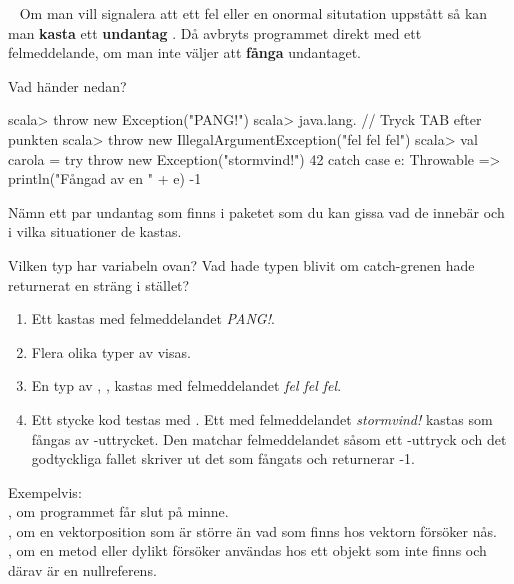 \QUESTBEGIN

\Task  \what~  Om man vill signalera att ett fel eller en onormal situtation uppstått så kan man \textbf{kasta}  ett \textbf{undantag} . Då avbryts programmet direkt med ett felmeddelande, om man inte väljer att \textbf{fånga}  undantaget.

\Subtask Vad händer nedan?
\begin{REPL}
scala> throw new Exception("PANG!")
scala> java.lang.   // Tryck TAB efter punkten
scala> throw new IllegalArgumentException("fel fel fel")
scala> val carola = 
         try 
           throw new Exception("stormvind!")
           42
         catch 
           case e: Throwable => 
             println("Fångad av en " + e)
             -1
\end{REPL}
\Subtask Nämn ett par undantag som finns i paketet  som du kan gissa vad de innebär och i vilka situationer de kastas.

\Subtask Vilken typ har variabeln  ovan? Vad hade typen blivit om catch-grenen hade returnerat en sträng i stället?

\SOLUTION


\TaskSolved \what


\SubtaskSolved  \begin{enumerate}
\item Ett  kastas med felmeddelandet \textit{PANG!}.
\item Flera olika typer av  visas.
\item En typ av , , kastas med felmeddelandet \textit{fel fel fel}.
\item Ett stycke kod testas med . Ett  med felmeddelandet \textit{stormvind!} kastas som fångas av -uttrycket. Den matchar felmeddelandet såsom ett -uttryck och det godtyckliga fallet  skriver ut det  som fångats och returnerar -1.
\end{enumerate}

\SubtaskSolved  Exempelvis: \\
, om programmet får slut på minne.\\
, om en vektorposition som är större än vad som finns hos vektorn försöker nås.\\
, om en metod eller dylikt försöker användas hos ett objekt som inte finns och därav är en nullreferens.

